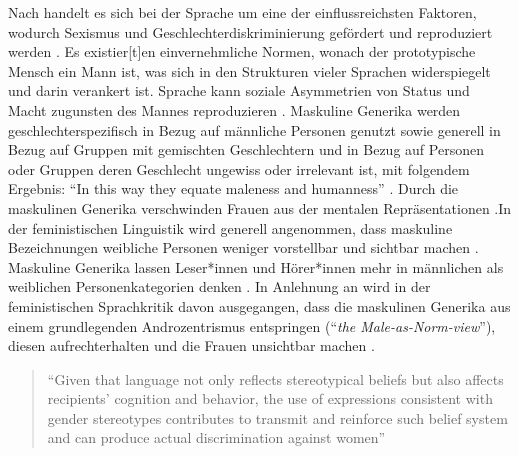 \documentclass[12pt, 
    twoside=false, 
    bibliography=totoc, 
    numbers=endperiod, 
    headings=normal, 
    toc=chapterentrydotfill
    ]{scrbook}
\begin{document}
Nach \textcite{menegatti_2017} handelt es sich bei der Sprache um eine der einflussreichsten Faktoren, wodurch Sexismus und Geschlechterdiskriminierung gefördert und reproduziert werden \parencite*[1]{menegatti_2017}. Es existier[t]en einvernehmliche Normen, wonach der prototypische Mensch ein Mann ist, was sich in den Strukturen vieler Sprachen widerspiegelt und darin verankert ist. Sprache kann soziale Asymmetrien von Status und Macht zugunsten des Mannes reproduzieren \parencite{menegatti_2017}.
Maskuline Generika werden geschlechterspezifisch in Bezug auf männliche Personen genutzt sowie generell in Bezug auf Gruppen mit gemischten Geschlechtern und in Bezug auf Personen oder Gruppen deren Geschlecht ungewiss oder irrelevant ist, mit folgendem Ergebnis: \enquote{In this way they equate maleness and humanness} \parencite[169]{stahlberg_2007}. Durch die maskulinen Generika verschwinden Frauen aus der mentalen Repräsentationen \parencites{vaughan_2018}{stahlberg_2001}.In der feministischen Linguistik wird generell angenommen, dass maskuline Bezeichnungen weibliche Personen weniger vorstellbar und sichtbar machen \parencite[131]{stahlberg_2001}. Maskuline Generika lassen Leser*innen und Hörer*innen mehr in männlichen als weiblichen Personenkategorien denken \parencites[2]{sczesny_2016}{stahlberg_2007}. In Anlehnung an \textcite{stahlberg_2007} wird in der feministischen Sprachkritik davon ausgegangen, dass die maskulinen Generika aus einem grundlegenden Androzentrismus entspringen (\enquote{\emph{the Male-as-Norm-view}}), diesen aufrechterhalten und die Frauen unsichtbar machen \parencites[170]{stahlberg_2007}{miller_1976}{silveira_1980}.

\citereset
\begin{quote}
    \enquote{Given that language not only reflects stereotypical beliefs but also affects recipients’ cognition and behavior, the use of expressions consistent with gender stereotypes contributes to transmit and reinforce such belief system and can produce actual discrimination against women} \parencite[2]{menegatti_2017}
\end{quote}
\end{document}
